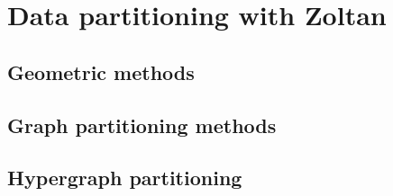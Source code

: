 %
%
\chapter{Data partitioning with Zoltan}
\label{cha:partitioning}

\section{Geometric methods}

\section{Graph partitioning methods}

\section{Hypergraph partitioning}
